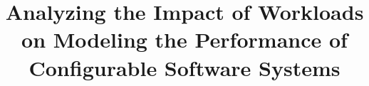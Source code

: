 \documentclass[10pt,conference]{IEEEtran}
\begin{document}
	
	\title{
		Analyzing the Impact of Workloads on Modeling the Performance of Configurable Software Systems
	}
	
	
	
	\maketitle

	
	
	
	
	
\end{document}
